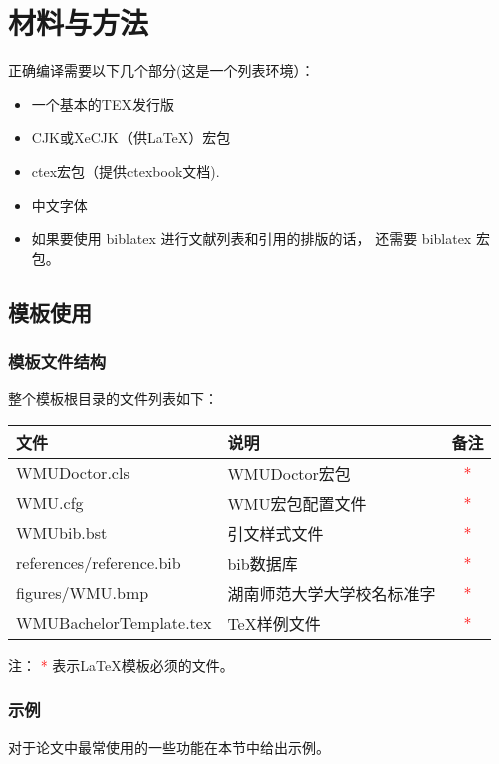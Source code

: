 \chapter{材料与方法}

正确编译需要以下几个部分(这是一个列表环境）：
\begin{itemize}
    \item 一个基本的TEX发行版
    \item CJK或XeCJK（供\LaTeX{}）宏包
    \item ctex宏包（提供ctexbook文档).
    \item 中文字体
    \item 如果要使用 biblatex 进行文献列表和引用的排版的话， 还需要 biblatex 宏包。
\end{itemize}

\section{模板使用}
\subsection{模板文件结构\label{sec:files}}
整个模板根目录的文件列表如下：
\begin{center}
    \begin{tabular}{llc}
        \toprule
        文件                     & 说明                       & 备注                 \\
        \midrule
        WMUDoctor.cls            & WMUDoctor宏包              & \textcolor{red}{{*}} \\
        WMU.cfg                  & WMU宏包配置文件            & \textcolor{red}{{*}} \\
        WMUbib.bst               & 引文样式文件               & \textcolor{red}{{*}} \\
        references/reference.bib & bib数据库                  & \textcolor{red}{{*}} \\
        figures/WMU.bmp          & 湖南师范大学大学校名标准字 & \textcolor{red}{{*}} \\
        WMUBachelorTemplate.tex  & \TeX{}样例文件             & \textcolor{red}{{*}} \\
        \bottomrule
    \end{tabular}
\end{center}
注： \textcolor{red}{{*}} 表示\LaTeX{}模板必须的文件。
\subsection{示例}
对于论文中最常使用的一些功能在本节中给出示例。
